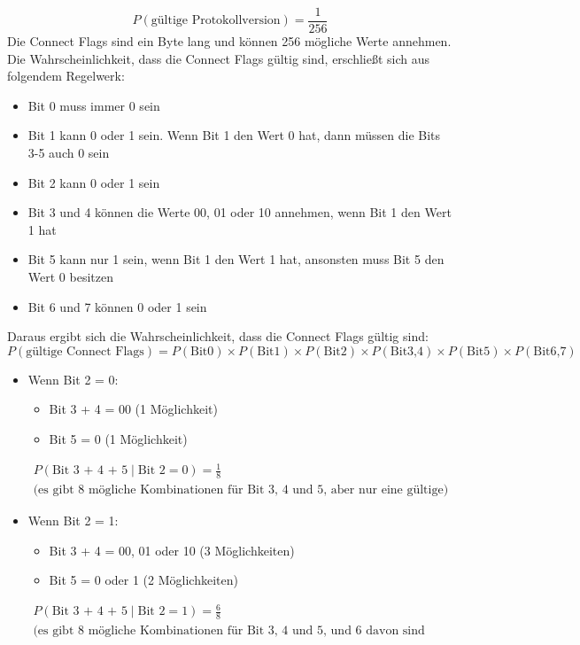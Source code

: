 \[
    P(\text{gültige Protokollversion}) = \frac{1}{256}
\]
Die Connect Flags sind ein Byte lang und können 256 mögliche Werte annehmen.
Die Wahrscheinlichkeit, dass die Connect Flags gültig sind, erschließt sich aus folgendem Regelwerk:
\begin{itemize}
    \item Bit 0 muss immer 0 sein
    \item Bit 1 kann 0 oder 1 sein. Wenn Bit 1 den Wert 0 hat, dann müssen die Bits 3-5 auch 0 sein
    \item Bit 2 kann 0 oder 1 sein
    \item Bit 3 und 4 können die Werte 00, 01 oder 10 annehmen, wenn Bit 1 den Wert 1 hat
    \item Bit 5 kann nur 1 sein, wenn Bit 1 den Wert 1 hat, ansonsten muss Bit 5 den Wert 0 besitzen
    \item Bit 6 und 7 können 0 oder 1 sein
\end{itemize}
Daraus ergibt sich die Wahrscheinlichkeit, dass die Connect Flags gültig sind:
\begin{equation}\label{eq:valid_connect_flags}
    P(\text{gültige Connect Flags}) = P(\text{Bit0}) \times P(\text{Bit1}) \times P(\text{Bit2}) \times P(\text{Bit3,4}) \times P(\text{Bit5}) \times P(\text{Bit6,7})
\end{equation}
\begin{itemize}
    \item Wenn Bit 2 = 0:

    \begin{itemize}
        \item Bit 3 + 4 = 00 (1 Möglichkeit)
        \item Bit 5 = 0 (1 Möglichkeit)
    \end{itemize}
\begin{multline}
    P(\text{Bit 3 + 4 + 5} \mid \text{Bit 2} = 0) = \frac{1}{8} \quad \\ \text{(es gibt 8 mögliche Kombinationen für Bit 3, 4 und 5, aber nur eine gültige)}
\end{multline}
    \item Wenn Bit 2 = 1:

    \begin{itemize}
        \item Bit 3 + 4 = 00, 01 oder 10 (3 Möglichkeiten)
        \item Bit 5 = 0 oder 1 (2 Möglichkeiten)
    \end{itemize}
\begin{multline}
    P(\text{Bit 3 + 4 + 5} \mid \text{Bit 2} = 1) = \frac{6}{8} \quad \\ \text{(es gibt 8 mögliche Kombinationen für Bit 3, 4 und 5, und 6 davon sind gültig)}
\end{multline}
\end{itemize}

